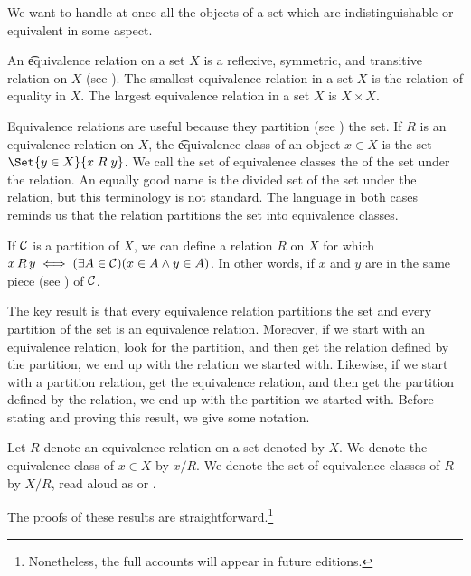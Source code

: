 

We want to handle at once all the objects of a set which are indistinguishable or equivalent in some aspect.


An \t{equivalence relation} on a set $X$ is a reflexive, symmetric, and transitive relation on $X$ (see ).
The smallest equivalence relation in a set $X$ is the relation of equality in $X$.
The largest equivalence relation in a set $X$ is $X \times X$.

Equivalence relations are useful because they partition (see ) the set.
If $R$ is an equivalence relation on $X$, the \t{equivalence class} of an object $x \in X$ is the set $\Set{y \in X}{x\;R\;y}$.
We call the set of equivalence classes the  of the set under the relation.
An equally good name is the divided set of the set under the relation, but this terminology is not standard.
The language in both cases reminds us that the relation partitions the set into equivalence classes.

If $\mathcal{C}$ is a partition of $X$, we can define a relation $R$ on $X$ for which $x\,R\,y \iff (\exists A \in \mathcal{C})(x \in A \land y \in A)$.
In other words, if $x$ and $y$ are in the same piece (see ) of $\mathcal{C}$.

The key result is that every equivalence relation partitions the set and every partition of the set is an equivalence relation.
Moreover, if we start with an equivalence relation, look for the partition, and then get the relation defined by the partition, we end up with the relation we started with.
Likewise, if we start with a partition relation, get the equivalence relation, and then get the partition defined by the relation, we end up with the partition we started with.
Before stating and proving this result, we give some notation.


Let $R$ denote an equivalence relation on a set denoted by $X$.
We denote the equivalence class of $x \in X$ by $x / R$.
We denote the set of equivalence classes of $R$ by $X/R$, read aloud as  or .


The proofs of these results are straightforward.\footnote{Nonetheless, the full accounts will appear in future editions.}

